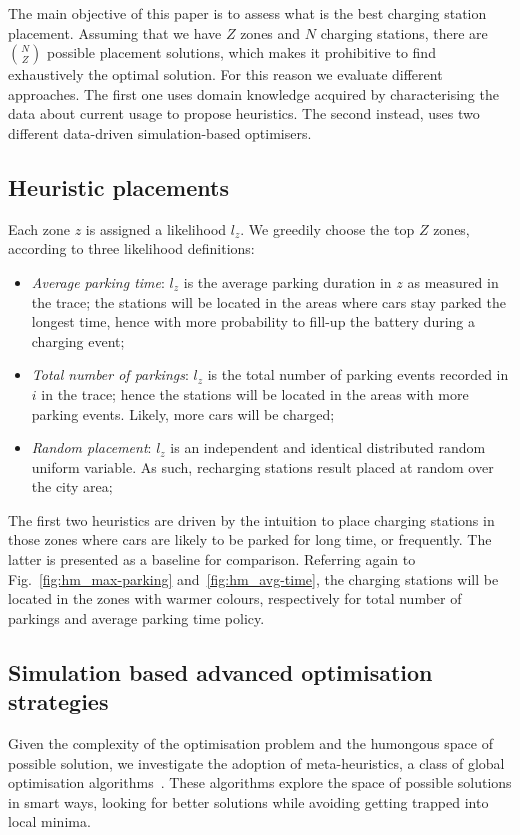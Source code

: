 \documentclass[review, letterpaper,3p, 11pt]{elsarticle}
\begin{document}
The main objective of this paper is to assess what is the best charging station placement. Assuming that we have $Z$ zones and $N$ charging stations, there are ${N}\choose{Z}$ possible placement solutions, which makes it prohibitive to find exhaustively the optimal solution. For this reason we evaluate different approaches. The first one uses domain knowledge acquired by characterising the data about current usage to propose heuristics. The second instead, uses two different data-driven simulation-based optimisers.

\subsection{Heuristic placements}

Each zone $z$ is assigned a likelihood $l_z$. We greedily choose the top $Z$ zones, according to three likelihood definitions:
 \begin{itemize} 
\item{\it Average parking time}: $l_z$ is the average parking duration in $z$ as measured in the trace; the stations will be located in the areas where cars stay parked the longest time, hence with more probability to fill-up the battery during a charging event;
\item{\it Total number of parkings}: $l_z$ is the total number of parking events recorded in $i$ in the trace; hence the stations will be located in the areas with more parking events. Likely, more cars will be charged;
\item{\it Random placement}: $l_z$ is an independent and identical distributed random uniform variable. As such, recharging stations result placed at random over the city area;
 \end{itemize} 
The first two heuristics are driven by the intuition to place charging stations in those zones where cars are likely to be parked for long time, or frequently. The latter is presented as a baseline for comparison. Referring again to Fig.~\ref{fig:hm_max-parking} and~\ref{fig:hm_avg-time}, the charging stations will be located in the zones with warmer colours, respectively for total number of parkings and average parking time policy.

\subsection{Simulation based advanced optimisation strategies}\label{sec:optmizers}

Given the complexity of the optimisation problem and the humongous space of possible solution, we investigate the adoption of meta-heuristics, a class of global optimisation algorithms~\cite{RA09}. These algorithms explore the space of possible solutions in smart ways, looking for better solutions while avoiding getting trapped into local minima.
\end{document}
